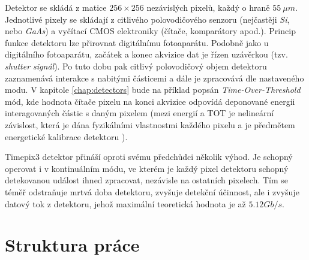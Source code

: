Detektor se skládá z matice $256\times256$ nezávislých pixelů, každý o hraně $55~\mu m$. 
Jednotlivé pixely se skládají z citlivého polovodičového senzoru (nejčastěji \textit{Si}, nebo \textit{GaAs}) a vyčítací CMOS elektroniky (čítače, komparátory apod.). Princip funkce detektoru lze přirovnat digitálnímu fotoaparátu. Podobně jako u digitálního fotoaparátu, začátek a konec akvizice dat je řízen uzávěrkou (tzv. \textit{shutter signál}). Po tuto dobu pak citlivý polovodičový objem detektoru zaznamenává interakce s nabitými částicemi a dále je zpracovává dle nastaveného modu. V kapitole \ref{chap:detectors} bude na příklad popsán \textit{Time-Over-Threshold} mód, kde hodnota čítače pixelu na konci akvizice odpovídá deponované energii interagovaných částic s daným pixelem (mezi energií a TOT je nelineární závislost, která je dána fyzikálními vlastnostmi každého pixelu a je předmětem energetické kalibrace detektoru \cite{Jakubek2011S262}). 

Timepix3 detektor přináší oproti svému předchůdci několik výhod. Je schopný operovat i v kontinuálním módu, ve kterém je každý pixel detektoru schopný detekovanou událost ihned zpracovat, nezávisle na ostatních pixelech. Tím se téměř odstraňuje mrtvá doba detektoru, zvyšuje detekční účinnost, ale i zvyšuje datový tok z detektoru, jehož maximální teoretická hodnota je až $5.12 Gb/s$.

\section{Struktura práce}
\todo